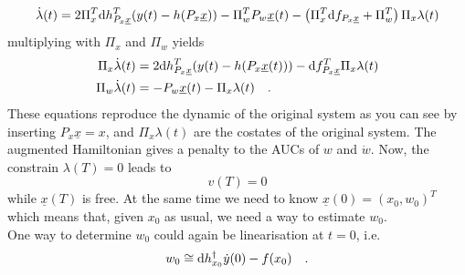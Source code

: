 	\begin{equation}
	\dot{\lambda}(t) = 2 \Pi_x^T \text{d} h^T_{P_x\underline{x}} (y(t)-h(P_x\underline{x})) 
	-\Pi_w^T P_w\underline{x}(t) - \left(\Pi_x^T \text{d} f_{P_x\underline{x}} + \Pi_w^T
	\right) \Pi_x \lambda(t) 
	\end{equation}
	multiplying with $\Pi_x$ and $\Pi_w$ yields
	\begin{align}
	\Pi_x\dot{\lambda}(t) &= 2 \text{d} h^T_{P_x\underline{x}} (y(t)-h(P_x\underline{x}(t))) 
	-\text{d} f_{P_x\underline{x}}^T \Pi_x \lambda(t)\\
	\Pi_w\dot{\lambda}(t) &= -P_w\underline{x}(t) - \Pi_x \lambda(t) \quad .
	\end{align}
	These equations reproduce the dynamic of the original system as you can see by 
	inserting $P_x \underline{x}=x$, and $\Pi_x \lambda(t)$ are the costates of the 
	original system. The augmented Hamiltonian gives a penalty to the AUCs of $w$ and 
	$\dot{w}$. Now, the constrain $\lambda(T)=0$ leads to 
	\begin{equation}
	v(T) = 0
	\end{equation}
	while $\underline{x}(T)$ is free. At the same time we need to know $\underline{x}(0)
	=(x_0,w_0)^T$ which means that, given $x_0$ as usual, we need a way to estimate 
	$w_0$.
	\\
	
	One way to determine $w_0$ could again be linearisation at $t=0$, i.e.
	\begin{equation}
	w_0 \cong \text{d} h_{x_0}^\dagger \dot{y}(0) - f(x_0) \quad .
	\end{equation}
